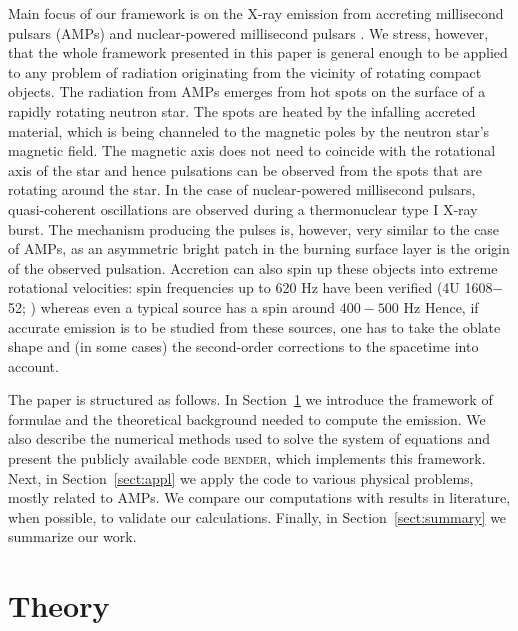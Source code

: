 \documentclass{aa}
\begin{document}
Main focus of our framework is on the X-ray emission from accreting millisecond pulsars (AMPs) \citep{WvdK98, PW12} and nuclear-powered millisecond pulsars \citep{Watts12}.
We stress, however, that the whole framework presented in this paper is general enough to be applied to any problem of radiation originating from the vicinity of rotating compact objects. 
The radiation from AMPs emerges from hot spots on the surface of a rapidly rotating neutron star. The spots are heated by the infalling accreted material, which is being channeled to the magnetic poles by the neutron star's magnetic field.
The magnetic axis does not need to coincide with the rotational axis of the star and hence pulsations can be observed from the spots that are rotating around the star.
In the case of nuclear-powered millisecond pulsars, quasi-coherent oscillations are observed during a thermonuclear type I X-ray burst.
The mechanism producing the pulses is, however, very similar to the case of AMPs, as an asymmetric bright patch in the burning surface layer is the origin of the observed pulsation.
Accretion can also spin up these objects into extreme rotational velocities: spin frequencies up to 620 Hz have been verified (4U 1608$-$52; \citealt{MC02}) whereas even a typical source has a spin around $400-500$ Hz \citep{Watts12, PTR14}
Hence, if accurate emission is to be studied from these sources, one has to take the oblate shape and (in some cases) the second-order corrections to the spacetime into account.


The paper is structured as follows.
In Section~\ref{sect:theory} we introduce the framework of formulae and the theoretical background needed to compute the emission.
We also describe the numerical methods used to solve the system of equations and present the publicly available code \textsc{bender},%
which implements this framework.
Next, in Section~\ref{sect:appl} we apply the code to various physical problems, mostly related to AMPs.
We compare our computations with results in literature, when possible, to validate our calculations.
Finally, in Section~\ref{sect:summary} we summarize our work.




\section{Theory}\label{sect:theory}
\end{document}
